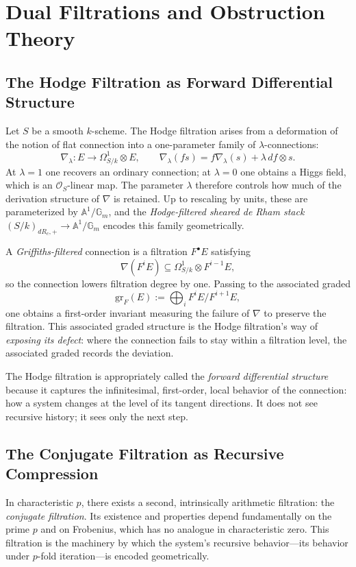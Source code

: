 \documentclass[12pt]{article}
\begin{document}
\section{Dual Filtrations and Obstruction Theory}

\subsection{The Hodge Filtration as Forward Differential Structure}

Let $S$ be a smooth $k$-scheme. The Hodge filtration arises from a deformation of the
notion of flat connection into a one-parameter family of $\lambda$-connections:
\[
\nabla_\lambda : E \to \Omega^1_{S/k} \otimes E,
\qquad
\nabla_\lambda(f s) = f \nabla_\lambda(s) + \lambda\, df \otimes s.
\]
At $\lambda = 1$ one recovers an ordinary connection; at $\lambda = 0$ one obtains a
Higgs field, which is an $\mathcal{O}_S$-linear map. The parameter $\lambda$ therefore
controls how much of the derivation structure of $\nabla$ is retained. Up to rescaling
by units, these are parameterized by $\mathbb{A}^1/\mathbb{G}_m$, and the
\emph{Hodge-filtered sheared de Rham stack} $(S/k)_{dR_c,+} \to \mathbb{A}^1/\mathbb{G}_m$
encodes this family geometrically.

A \emph{Griffiths-filtered} connection is a filtration $F^\bullet E$ satisfying
\[
\nabla(F^i E) \subseteq \Omega^1_{S/k} \otimes F^{i-1}E,
\]
so the connection lowers filtration degree by one. Passing to the associated graded
\[
\mathrm{gr}_F(E) := \bigoplus_i F^i E / F^{i+1}E,
\]
one obtains a first-order invariant measuring the failure of $\nabla$ to preserve the
filtration. This associated graded structure is the Hodge filtration's way of
\emph{exposing its defect}: where the connection fails to stay within a filtration
level, the associated graded records the deviation.

The Hodge filtration is appropriately called the \emph{forward differential structure}
because it captures the infinitesimal, first-order, local behavior of the connection:
how a system changes at the level of its tangent directions. It does not see recursive
history; it sees only the next step.

\subsection{The Conjugate Filtration as Recursive Compression}

In characteristic $p$, there exists a second, intrinsically arithmetic filtration: the
\emph{conjugate filtration}. Its existence and properties depend fundamentally on the
prime $p$ and on Frobenius, which has no analogue in characteristic zero. This
filtration is the machinery by which the system's recursive behavior---its behavior
under $p$-fold iteration---is encoded geometrically.
\end{document}
